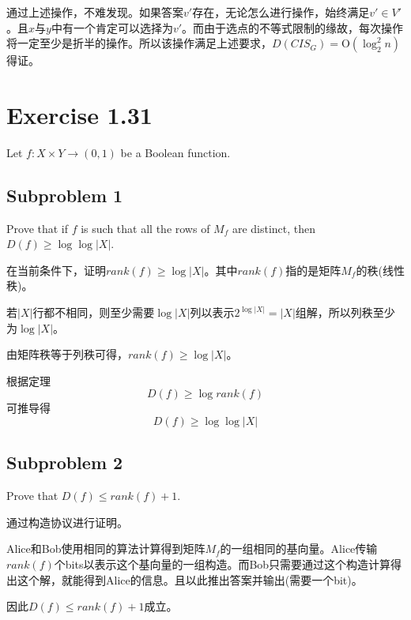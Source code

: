 \documentclass[11pt, fleqn, a4paper]{report}
\begin{document}
通过上述操作，不难发现。如果答案$v'$存在，无论怎么进行操作，始终满足$v' \in V'$。且$x$与$y$中有一个肯定可以选择为$v'$。而由于选点的不等式限制的缘故，每次操作将一定至少是折半的操作。所以该操作满足上述要求，$D(CIS_G)= \mathrm{O}(\log_2^2{n})$得证。

\newpage

\section*{Exercise 1.31}
Let $f: X \times Y \rightarrow (0,1)$ be a Boolean function.

\subsection*{Subproblem 1}
Prove that if $f$ is such that all the rows of $M_f$ are distinct, then $D(f) \geq \log{\log{|X|}}$.

在当前条件下，证明$rank(f) \geq \log{|X|}$。其中$rank(f)$指的是矩阵$M_f$的秩(线性秩)。

若$|X|$行都不相同，则至少需要$\log{|X|}$列以表示$2^{\log{|X|}} = |X|$组解，所以列秩至少为$\log{|X|}$。

由矩阵秩等于列秩可得，$rank(f) \geq \log{|X|}$。

根据定理$$D(f) \geq \log{rank(f)}$$可推导得$$D(f) \geq \log{\log{|X|}}$$

\subsection*{Subproblem 2}
Prove that $D(f) \leq rank(f) + 1$.

通过构造协议进行证明。

Alice和Bob使用相同的算法计算得到矩阵$M_f$的一组相同的基向量。Alice传输$rank(f)$个bits以表示这个基向量的一组构造。而Bob只需要通过这个构造计算得出这个解，就能得到Alice的信息。且以此推出答案并输出(需要一个bit)。

因此$D(f) \leq rank(f) + 1$成立。
\end{document}
